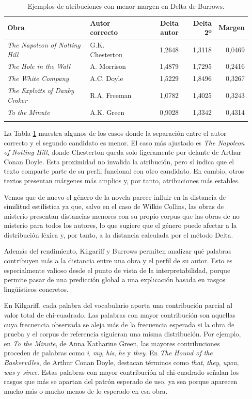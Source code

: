 \documentclass[IB]{TFUOC}%
\begin{document}
\begin{longtable}{|p{5.4cm}|p{3.1cm}|r|r|r|}
\hline
\textbf{Obra} & \textbf{Autor correcto} & \textbf{Delta autor} & \textbf{Delta 2º} & \textbf{Margen} \\
\hline
\textit{The Napoleon of Notting Hill} & G.K. Chesterton & 1,2648 & 1,3118 & 0,0469 \\
\hline
\textit{The Hole in the Wall} & A. Morrison & 1,4879 & 1,7295 & 0,2416 \\
\hline
\textit{The White Company} & A.C. Doyle & 1,5229 & 1,8496 & 0,3267 \\
\hline
\textit{The Exploits of Danby Croker} & R.A. Freeman & 1,0782 & 1,4025 & 0,3243 \\
\hline
\textit{To the Minute} & A.K. Green & 0,9028 & 1,3342 & 0,4314 \\
\hline
\caption{Ejemplos de atribuciones con menor margen en Delta de Burrows.}
\label{tab:burrows-menor-margen}
\end{longtable}

La Tabla \ref{tab:burrows-menor-margen} muestra algunos de los casos donde la separación entre el autor correcto y el segundo candidato es menor. El caso más ajustado es \textit{The Napoleon of Notting Hill}, donde Chesterton queda solo ligeramente por delante de Arthur Conan Doyle. Esta proximidad no invalida la atribución, pero sí indica que el texto comparte parte de su perfil funcional con otro candidato. En cambio, otros textos presentan márgenes más amplios y, por tanto, atribuciones más estables.

Vemos que de nuevo el género de la novela parece influir en la distancia de similitud estilística ya que, salvo en el caso de Wilkie Collins, las obras de misterio presentan distancias menores con su propio corpus que las obras de no misterio para todos los autores, lo que sugiere que el género puede afectar a la distribución léxica y, por tanto, a la distancia calculada por el método Delta.

Además del rendimiento, Kilgariff y Burrows permiten analizar qué palabras contribuyen más a la distancia entre una obra y el perfil de su autor. Esto es especialmente valioso desde el punto de vista de la interpretabilidad, porque permite pasar de una predicción global a una explicación basada en rasgos lingüísticos concretos.

En Kilgariff, cada palabra del vocabulario aporta una contribución parcial al valor total de chi-cuadrado. Las palabras con mayor contribución son aquellas cuya frecuencia observada se aleja más de la frecuencia esperada si la obra de prueba y el corpus de referencia siguieran una misma distribución. Por ejemplo, en \textit{To the Minute}, de Anna Katharine Green, las mayores contribuciones proceden de palabras como \textit{i}, \textit{my}, \textit{his}, \textit{he} y \textit{they}. En \textit{The Hound of the Baskervilles}, de Arthur Conan Doyle, destacan términos como \textit{that}, \textit{they}, \textit{upon}, \textit{was} y \textit{since}. Estas palabras con mayor contribución al chi-cuadrado señalan los rasgos que más se apartan del patrón esperado de uso, ya sea porque aparecen mucho más o mucho menos de lo esperado en esa obra.
\end{document}
